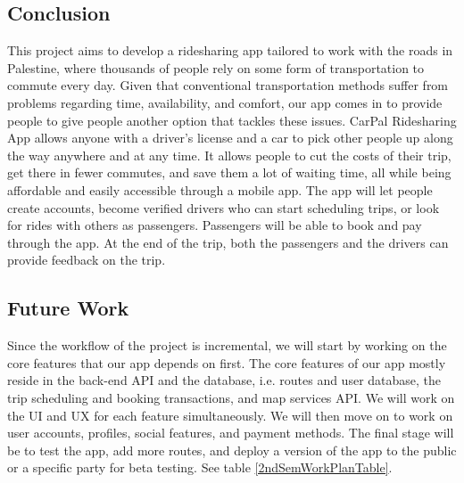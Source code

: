 \documentclass[a4paper, 12pt]{article} %
\begin{document}
        \subsection{Conclusion}
            This project aims to develop a ridesharing app tailored to work with the roads in Palestine, where thousands of people rely on some form of transportation to commute every day. Given that conventional transportation methods suffer from problems regarding time, availability, and comfort, our app comes in to provide people to give people another option that tackles these issues. CarPal Ridesharing App allows anyone with a driver's license and a car to pick other people up along the way anywhere and at any time. It allows people to cut the costs of their trip, get there in fewer commutes, and save them a lot of waiting time, all while being affordable and easily accessible through a mobile app. The app will let people create accounts, become verified drivers who can start scheduling trips, or look for rides with others as passengers. Passengers will be able to book and pay through the app. At the end of the trip, both the passengers and the drivers can provide feedback on the trip.
        \subsection{Future Work}
            Since the workflow of the project is incremental, we will start by working on the core features that our app depends on first. The core features of our app mostly reside in the back-end API and the database, i.e. routes and user database, the trip scheduling and booking transactions, and map services API. We will work on the UI and UX for each feature simultaneously. We will then move on to work on user accounts, profiles, social features, and payment methods. The final stage will be to test the app, add more routes, and deploy a version of the app to the public or a specific party for beta testing. See table \ref{2ndSemWorkPlanTable}.
\end{document}
